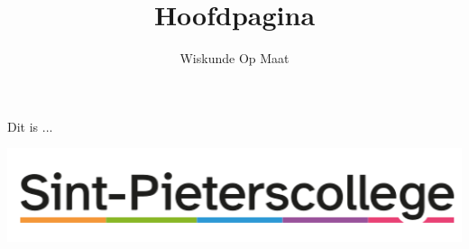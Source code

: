 \documentclass{ximera}
\begin{document}
	\author{Wiskunde Op Maat}
	\title{Hoofdpagina}
    \begin{abstract}\end{abstract}
	\label{xim:veeltermen_eentermen}

	\maketitle


	Dit is ...

	\includegraphics{logo}
\end{document}
